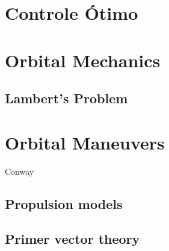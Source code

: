 \section{Controle Ótimo}

\section{Orbital Mechanics}

\subsection{Lambert's Problem}

\section{Orbital Maneuvers}
Conway
\subsection{Propulsion models}

\subsection{Primer vector theory}

